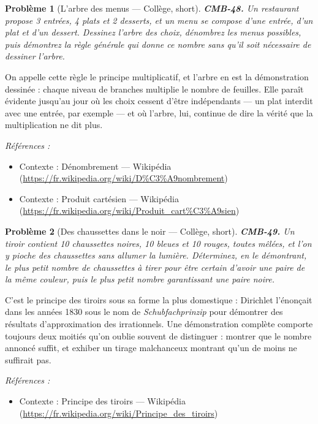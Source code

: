\documentclass[11pt]{article}
\newtheorem{problem}{Problème}
\newenvironment{refs}{\par\small\noindent\emph{Références :}\begin{itemize}\setlength\itemsep{0pt}}{\end{itemize}\normalsize}
\begin{document}
\bigskip

\begin{problem}[{L'arbre des menus --- Collège, short}]
\textbf{CMB-48.} Un restaurant propose 3 entrées, 4 plats et 2 desserts, et un
menu se compose d'une entrée, d'un plat et d'un dessert. Dessinez l'arbre des choix, dénombrez les
menus possibles, puis démontrez la règle générale qui donne ce nombre sans qu'il soit nécessaire de
dessiner l'arbre.
\end{problem}

\noindent On appelle cette règle le principe multiplicatif, et l'arbre en est la
démonstration dessinée : chaque niveau de branches multiplie le nombre de feuilles. Elle paraît
évidente jusqu'au jour où les choix cessent d'être indépendants --- un plat interdit avec une entrée,
par exemple --- et où l'arbre, lui, continue de dire la vérité que la multiplication ne dit plus.

\begin{refs}
\item Contexte : Dénombrement --- Wikipédia (\url{https://fr.wikipedia.org/wiki/D%C3%A9nombrement})
\item Contexte : Produit cartésien --- Wikipédia (\url{https://fr.wikipedia.org/wiki/Produit_cart%C3%A9sien})
\end{refs}

\bigskip

\begin{problem}[{Des chaussettes dans le noir --- Collège, short}]
\textbf{CMB-49.} Un tiroir contient 10 chaussettes noires, 10 bleues et 10
rouges, toutes mêlées, et l'on y pioche des chaussettes sans allumer la lumière. Déterminez, en le
démontrant, le plus petit nombre de chaussettes à tirer pour être certain d'avoir une paire de la
même couleur, puis le plus petit nombre garantissant une paire noire.
\end{problem}

\noindent C'est le principe des tiroirs sous sa forme la plus domestique : Dirichlet
l'énonçait dans les années 1830 sous le nom de \textit{Schubfachprinzip} pour démontrer des résultats
d'approximation des irrationnels. Une démonstration complète comporte toujours deux moitiés qu'on
oublie souvent de distinguer : montrer que le nombre annoncé suffit, et exhiber un tirage
malchanceux montrant qu'un de moins ne suffirait pas.

\begin{refs}
\item Contexte : Principe des tiroirs --- Wikipédia (\url{https://fr.wikipedia.org/wiki/Principe_des_tiroirs})
\end{refs}
\end{document}
